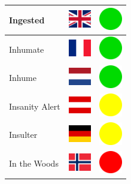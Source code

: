 \documentclass[12pt, a4paper, twoside]{report}
\begin{document}
\begin{center}
\begin{longtable}{|p{5cm}|p{2cm}|p{2cm}|}
 Ingested                                                   & \includegraphics[width=1cm]{../img/flags/gb} &   \includegraphics[width=1cm]{../likes/y} \\ \hline
 Inhumate                                                   & \includegraphics[width=1cm]{../img/flags/fr} &   \includegraphics[width=1cm]{../likes/y} \\ \hline
 Inhume                                                     & \includegraphics[width=1cm]{../img/flags/nl} &   \includegraphics[width=1cm]{../likes/y} \\ \hline
 Insanity Alert                                             & \includegraphics[width=1cm]{../img/flags/at} &   \includegraphics[width=1cm]{../likes/m} \\ \hline
 Insulter                                                   & \includegraphics[width=1cm]{../img/flags/de} &   \includegraphics[width=1cm]{../likes/m} \\ \hline
 In the Woods                                               & \includegraphics[width=1cm]{../img/flags/no} &   \includegraphics[width=1cm]{../likes/n} \\ \hline

\end{longtable}
\end{center}
\end{document}
